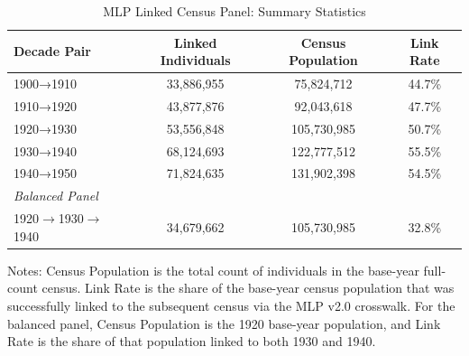 
\begin{table}[H]
\centering
\caption{MLP Linked Census Panel: Summary Statistics}
\begin{threeparttable}
\small
\begin{tabular}{lccc}
\toprule
Decade Pair & Linked Individuals & Census Population & Link Rate \\
\midrule
1900→1910 & 33,886,955 &  75,824,712 & 44.7\% \\
1910→1920 & 43,877,876 &  92,043,618 & 47.7\% \\
1920→1930 & 53,556,848 & 105,730,985 & 50.7\% \\
1930→1940 & 68,124,693 & 122,777,512 & 55.5\% \\
1940→1950 & 71,824,635 & 131,902,398 & 54.5\% \\
\midrule
\multicolumn{4}{l}{\textit{Balanced Panel}} \\
1920$\rightarrow$1930$\rightarrow$1940 & 34,679,662 & 105,730,985 & 32.8\% \\
\bottomrule
\end{tabular}
\begin{tablenotes}[flushleft]
\small
\item Notes: Census Population is the total count of individuals in the base-year full-count census. Link Rate is the share of the base-year census population that was successfully linked to the subsequent census via the MLP v2.0 crosswalk. For the balanced panel, Census Population is the 1920 base-year population, and Link Rate is the share of that population linked to both 1930 and 1940.
\end{tablenotes}
\end{threeparttable}
\label{tab:panel_summary}
\end{table}

